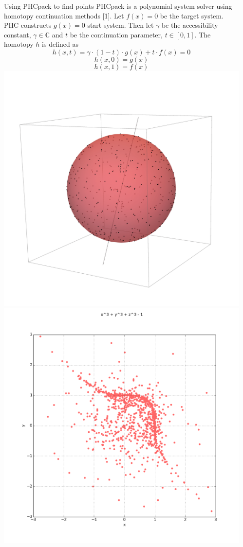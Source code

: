 \documentclass{beamer}
\def\C{\mathbb C}
\begin{document}
\begin{frame}{}
\begin{columns}[t]
\begin{column}{0.32\linewidth}
\begin{block}{Using PHCpack to find points}
PHCpack is a polynomial system solver using homotopy continuation methods [1]. Let $f(x) = 0$ be the target system. PHC constructs $g(x)=0$ start system. Then let $\gamma$ be the accessibility constant, $\gamma \in \C$ and $t$ be the continuation parameter, $t \in [0,1]$. The homotopy $h$ is defined as
\begin{equation*}
h(x,t) = \gamma \cdot (1-t)\cdot g(x) + t \cdot f(x) = 0
\end{equation*}
\begin{equation*}
h(x, 0) =g(x)
\end{equation*}
\begin{equation*}
h(x, 1) = f(x)
\end{equation*}
\includegraphics[width=.5\columnwidth]{sphere-1}
\includegraphics[width=.5\columnwidth]{plot2d_5}


\end{block}


\end{column}%

\begin{column}{0.32\linewidth}


\end{column}
\end{columns}
\end{frame}
\end{document}
